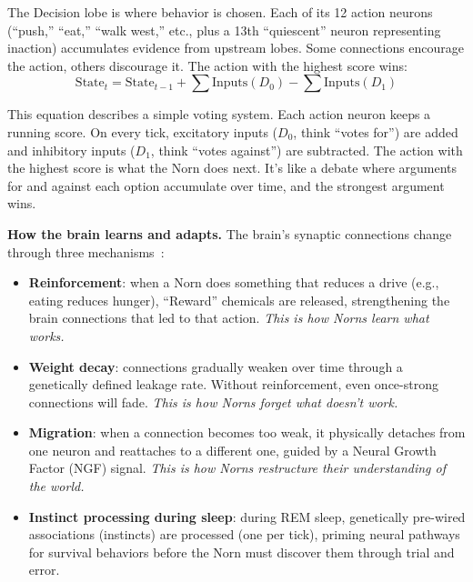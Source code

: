 \documentclass[12pt, a4paper]{article}
\begin{document}
The Decision lobe is where behavior is chosen. Each of its 12 action neurons (``push,'' ``eat,'' ``walk west,'' etc., plus a 13th ``quiescent'' neuron representing inaction) accumulates evidence from upstream lobes. Some connections encourage the action, others discourage it. The action with the highest score wins:
\begin{equation}
  \text{State}_t = \text{State}_{t-1} + \sum \text{Inputs}(D_0) - \sum \text{Inputs}(D_1)
  \label{eq:decision-sv}
\end{equation}

\begin{plainbox}
This equation describes a simple voting system. Each action neuron keeps a running score. On every tick, excitatory inputs ($D_0$, think ``votes for'') are added and inhibitory inputs ($D_1$, think ``votes against'') are subtracted. The action with the highest score is what the Norn does next. It's like a debate where arguments for and against each option accumulate over time, and the strongest argument wins.
\end{plainbox}

\noindent \textbf{How the brain learns and adapts.} The brain's synaptic connections change through three mechanisms~\cite{grand1998creatures}:
\begin{itemize}[nosep]
  \item \textbf{Reinforcement}: when a Norn does something that reduces a drive (e.g., eating reduces hunger), ``Reward'' chemicals are released, strengthening the brain connections that led to that action. \emph{This is how Norns learn what works.}
  \item \textbf{Weight decay}: connections gradually weaken over time through a genetically defined leakage rate. Without reinforcement, even once-strong connections will fade. \emph{This is how Norns forget what doesn't work.}
  \item \textbf{Migration}: when a connection becomes too weak, it physically detaches from one neuron and reattaches to a different one, guided by a Neural Growth Factor (NGF) signal. \emph{This is how Norns restructure their understanding of the world.}
  \item \textbf{Instinct processing during sleep}: during REM sleep, genetically pre-wired associations (instincts) are processed (one per tick), priming neural pathways for survival behaviors before the Norn must discover them through trial and error.
\end{itemize}
\end{document}
